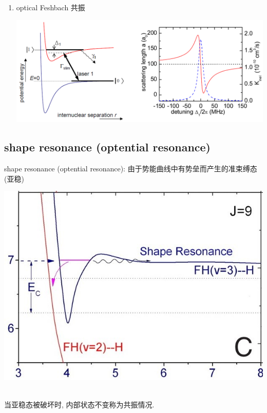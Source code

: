 \documentclass[10pt,a4paper,twocolumn]{article} %
\numberwithin{equation}{section} %
\begin{document}
\begin{enumerate}
\begin{centering}
	\end{centering}
	\item optical Feshbach 共振\\
	\begin{centering}
		\includegraphics[width=\linewidth]{ofr.jpg}
	\end{centering}
\end{enumerate}
\subsection{shape resonance (optential resonance)} %
\label{sub:shape_resonance}
shape resonance (optential resonance): 
由于势能曲线中有势垒而产生的准束缚态 (亚稳)\\
\begin{centering}
	\includegraphics[width=\linewidth]{shape-res.jpg}
\end{centering}\\
当亚稳态被破坏时, 内部状态不变称为共振情况.
\end{document}
